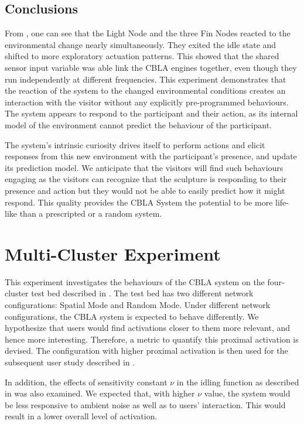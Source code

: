 \subsection{Conclusions}

From , one can see that the Light Node and the three Fin Nodes reacted to the environmental change nearly simultaneously. They exited the idle state and shifted to more exploratory actuation patterns. This showed that the shared sensor input variable was able link the CBLA engines together, even though they run independently at different frequencies. This experiment demonstrates that the reaction of the system to the changed environmental conditions creates an interaction with the visitor without any explicitly pre-programmed behaviours. The system appears to respond to the participant and their action, as its internal model of the environment cannot predict the behaviour of the participant. 

The system's intrinsic curiosity drives itself to perform actions and elicit responses from this new environment with the participant's presence, and update its prediction model. We anticipate that the visitors will find such behaviours engaging as the visitors can recognize that the sculpture is responding to their presence and action but they would not be able to easily predict how it might respond. This quality provides the CBLA System the potential to be more life-like than a prescripted or a random system. 



\section{Multi-Cluster Experiment}\label{sec:multi-cluster-experiment}

This experiment investigates the behaviours of the CBLA system on the four-cluster test bed described in . The test bed has two different network configurations: Spatial Mode and Random Mode. Under different network configurations, the CBLA system is expected to behave differently. We hypothesize that users would find activations closer to them more relevant, and hence more interesting. Therefore, a metric to quantify this proximal activation is devised. The configuration with higher proximal activation is then used for the subsequent user study described in .

In addition, the effects of sensitivity constant $\nu$ in the idling function as described in  was also examined. We expected that, with higher $\nu$ value, the system would be less responsive to ambient noise as well as to users' interaction. This would result in a lower overall level of activation.  

